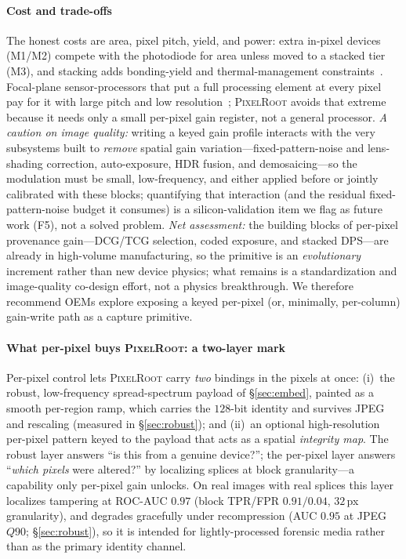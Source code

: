 \documentclass[journal]{IEEEtran}
\newcommand{\pr}{\textup{\textsc{PixelRoot}}}
\begin{document}
\paragraph{Cost and trade-offs} The honest costs are area, pixel pitch, yield,
and power: extra in-pixel devices (M1/M2) compete with the photodiode for area
unless moved to a stacked tier (M3), and stacking adds bonding-yield and
thermal-management constraints~\cite{cucu_hybridbond2025}. Focal-plane
sensor-processors that put a full processing element at every pixel pay for it
with large pitch and low resolution~\cite{focalplane_carey2013,svgain2025};
\pr{} avoids that extreme because it needs only a small per-pixel gain register,
not a general processor. \emph{A caution on image quality:} writing a keyed gain
profile interacts with the very subsystems built to \emph{remove} spatial gain
variation---fixed-pattern-noise and lens-shading correction, auto-exposure, HDR
fusion, and demosaicing---so the modulation must be small, low-frequency, and
either applied before or jointly calibrated with these blocks; quantifying that
interaction (and the residual fixed-pattern-noise budget it consumes) is a
silicon-validation item we flag as future work (F5), not a solved problem.
\emph{Net assessment:} the building blocks of per-pixel provenance gain---DCG/TCG
selection, coded exposure, and stacked DPS---are already in high-volume
manufacturing, so the primitive is an \emph{evolutionary} increment rather than
new device physics; what remains is a standardization and image-quality
co-design effort, not a physics breakthrough. We therefore recommend OEMs
explore exposing a keyed per-pixel (or, minimally, per-column) gain-write path as
a capture primitive.

\paragraph{What per-pixel buys \pr{}: a two-layer mark} Per-pixel control lets
\pr{} carry \emph{two} bindings in the pixels at once: (i)~the robust,
low-frequency spread-spectrum payload of \S\ref{sec:embed}, painted as a smooth
per-region ramp, which carries the $128$-bit identity and survives JPEG and
rescaling (measured in \S\ref{sec:robust}); and (ii)~an optional
high-resolution per-pixel pattern keyed to the payload that acts as a spatial
\emph{integrity map}. The robust layer answers ``is this from a genuine
device?''; the per-pixel layer answers ``\emph{which pixels} were altered?'' by
localizing splices at block granularity---a capability only per-pixel gain
unlocks. On real images with real splices this layer localizes tampering at
ROC-AUC $0.97$ (block TPR/FPR $0.91/0.04$, $32$\,px granularity), and degrades
gracefully under recompression (AUC $0.95$ at JPEG~$Q90$; \S\ref{sec:robust}), so
it is intended for lightly-processed forensic media
rather than as the primary identity channel.
\end{document}
